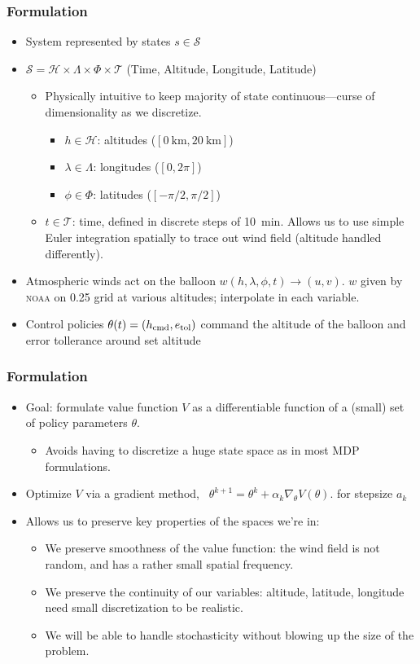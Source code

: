 \documentclass[10pt,mathserif]{beamer}
\begin{document}
\begin{frame}
\frametitle{Formulation}
\begin{itemize}

\item System represented by states $s \in \mathcal{S}$
\item $\mathcal{S} = \mathcal{H} \times \Lambda \times \Phi \times \mathcal{T}$ (Time, Altitude, Longitude, Latitude)
\begin{itemize}
\item Physically intuitive to keep majority of state continuous---curse of dimensionality as we discretize.
\begin{itemize}
\item $h \in \mathcal{H}$: altitudes ($[0~\text{km},20~\text{km}]$)
\item $\lambda \in \Lambda$: longitudes ($[0, 2\pi]$)  
\item $\phi \in \Phi$: latitudes ($[-\pi/2,\pi/2]$)
\end{itemize}
\item $t \in \mathcal{T}$: time, defined in discrete steps of 10~min. Allows us to use simple Euler integration spatially to trace out wind field (altitude handled differently).
\end{itemize}
\item Atmospheric winds act on the balloon $w(h, \lambda, \phi, t) \to (u, v)$. $w$ given by \textsc{noaa} on 0.25\textdegree{} grid at various altitudes; interpolate in each variable.
\item Control policies $\theta(t) = (h_{\mathrm{cmd}},e_{\mathrm{tol}})$ command the altitude of the balloon and error tollerance around set altitude
\end{itemize}
\end{frame}

\begin{frame}
\frametitle{Formulation}
\begin{itemize}
\item Goal: formulate value function $V$ as a differentiable function of a (small) set of policy parameters $\theta$.
\begin{itemize}
\item Avoids having to discretize a huge state space as in most MDP formulations.
\end{itemize}
\item Optimize $V$ via a gradient method, \eg\, $\theta^{k+1} = \theta^k + \alpha_k \nabla_\theta V(\theta)$. for stepsize $a_k$
\item Allows us to preserve key properties of the spaces we're in:
\begin{itemize}
\item We preserve smoothness of the value function: the wind field is not random, and has a rather small spatial frequency.
\item We preserve the continuity of our variables: altitude, latitude, longitude need small discretization to be realistic.
\item We will be able to handle stochasticity without blowing up the size of the problem.
\end{itemize}
\end{itemize}
\end{frame}
\end{document}
